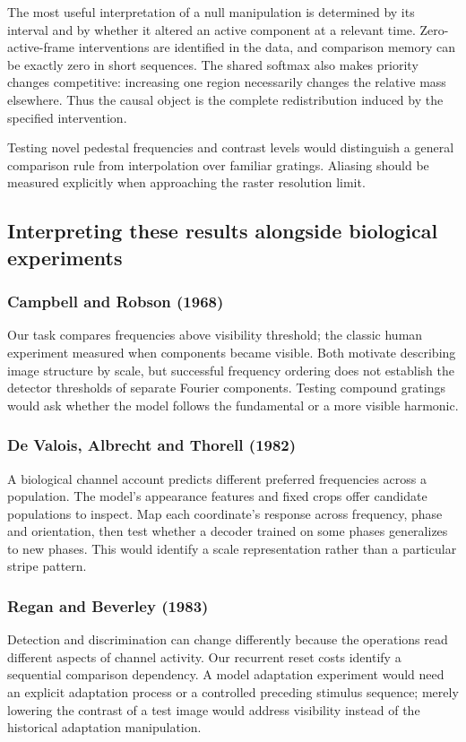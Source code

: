 \documentclass[11pt]{article}
\begin{document}
The most useful interpretation of a null manipulation is determined by its interval and by whether it altered an active component at a relevant time. Zero-active-frame interventions are identified in the data, and comparison memory can be exactly zero in short sequences. The shared softmax also makes priority changes competitive: increasing one region necessarily changes the relative mass elsewhere. Thus the causal object is the complete redistribution induced by the specified intervention.

Testing novel pedestal frequencies and contrast levels would distinguish a general comparison rule from interpolation over familiar gratings. Aliasing should be measured explicitly when approaching the raster resolution limit.

\subsection{Interpreting these results alongside biological experiments}
\subsubsection{Campbell and Robson (1968)}
Our task compares frequencies above visibility threshold; the classic human experiment measured when components became visible. Both motivate describing image structure by scale, but successful frequency ordering does not establish the detector thresholds of separate Fourier components. Testing compound gratings would ask whether the model follows the fundamental or a more visible harmonic. \cite{bio_campbell}

\subsubsection{De Valois, Albrecht and Thorell (1982)}
A biological channel account predicts different preferred frequencies across a population. The model’s appearance features and fixed crops offer candidate populations to inspect. Map each coordinate’s response across frequency, phase and orientation, then test whether a decoder trained on some phases generalizes to new phases. This would identify a scale representation rather than a particular stripe pattern. \cite{bio_devalois_f}

\subsubsection{Regan and Beverley (1983)}
Detection and discrimination can change differently because the operations read different aspects of channel activity. Our recurrent reset costs identify a sequential comparison dependency. A model adaptation experiment would need an explicit adaptation process or a controlled preceding stimulus sequence; merely lowering the contrast of a test image would address visibility instead of the historical adaptation manipulation. \cite{bio_regan}
\end{document}

